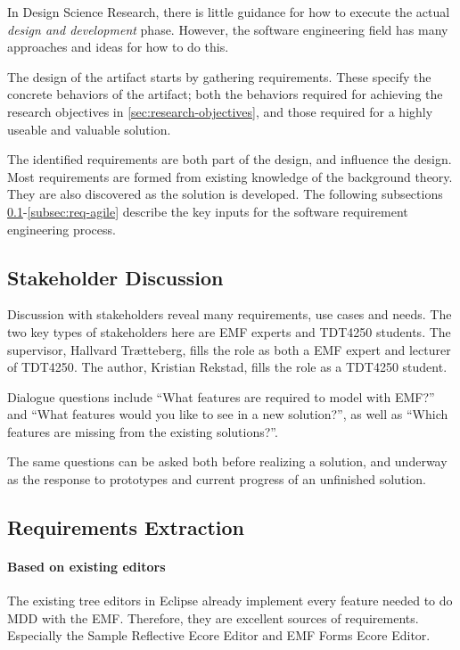 
In Design Science Research, there is little guidance for how to execute the actual \textit{design and development} phase.
However, the software engineering field has many approaches and ideas for how to do this.


The design of the artifact starts by gathering requirements.
These specify the concrete behaviors of the artifact; both the behaviors required for achieving the research objectives in \cref{sec:research-objectives}, and those required for a highly useable and valuable solution.


The identified requirements are both part of the design, and influence the design.
Most requirements are formed from existing knowledge of the background theory.
They are also discovered as the solution is developed.
The following subsections \ref{subsec:req-stakeholder}-\ref{subsec:req-agile} describe the key inputs for the software requirement engineering process.


\subsection{Stakeholder Discussion}\label{subsec:req-stakeholder}

Discussion with stakeholders reveal many requirements, use cases and needs.
The two key types of stakeholders here are \acrshort{EMF} experts and \gls{TDT4250} students.
The supervisor, Hallvard Trætteberg, fills the role as both a \acrshort{EMF} expert and lecturer of \gls{TDT4250}.
The author, Kristian Rekstad, fills the role as a \gls{TDT4250} student.


Dialogue questions include ``What features are required to model with \acrshort{EMF}?'' and ``What features would you like to see in a new solution?'', as well as ``Which features are missing from the existing solutions?''.


The same questions can be asked both before realizing a solution, and underway as the response to prototypes and current progress of an unfinished solution.


\subsection{Requirements Extraction}

\paragraph{Based on existing editors}
The existing tree editors in \gls{Eclipse} already implement every feature needed to do \acrlong{MDD} with the \acrlong{EMF}.
Therefore, they are excellent sources of requirements.
Especially the Sample Reflective Ecore Editor and EMF Forms Ecore Editor. %


